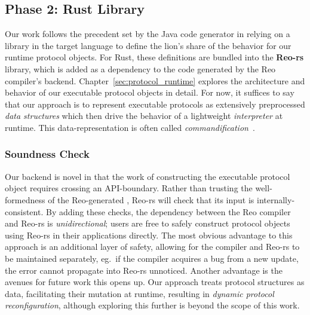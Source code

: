\subsection{Phase 2: Rust Library}
\label{sec:translation_phase_2}
Our work follows the precedent set by the Java code generator in relying on a library in the target language to define the lion's share of the behavior for our runtime protocol objects. For Rust, these definitions are bundled into the \textbf{Reo-rs} library, which is added as a dependency to the code generated by the Reo compiler's backend. Chapter~\ref{sec:protocol_runtime} explores the architecture and behavior of our executable protocol objects in detail. For now, it suffices to say that our approach is to represent executable protocols as extensively preprocessed \textit{data structures} which then drive the behavior of a lightweight \textit{interpreter} at runtime. This data-representation is often called \textit{commandification}~\cite{nystrom2014game}.

\subsubsection{Soundness Check}
Our backend is novel in that the work of constructing the executable protocol object requires crossing an API-boundary. Rather than trusting the well-formedness of the Reo-generated , Reo-rs will check that its input is internally-consistent. By adding these checks, the dependency between the Reo compiler and Reo-rs is \textit{unidirectional}; users are free to safely construct protocol objects using Reo-rs in their applications directly. The most obvious advantage to this approach is an additional layer of safety, allowing for the compiler and Reo-rs to be maintained separately, eg.\ if the compiler acquires a bug from a new update, the error cannot propagate into Reo-rs unnoticed. Another advantage is the avenues for future work this opens up. Our approach treats protocol structures as data, facilitating their mutation at runtime, resulting in \textit{dynamic protocol reconfiguration}, although exploring this further is beyond the scope of this work.

